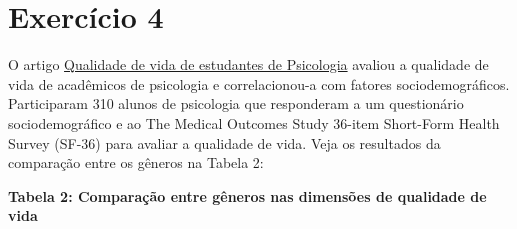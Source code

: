 \documentclass[
]{book}
\begin{document}
\section{Exercício 4}\label{exercuxedcio-4}

O artigo \href{https://pepsic.bvsalud.org/pdf/psicoinfo/v16n16/v16n16a07.pdf}{Qualidade de vida de estudantes de Psicologia} avaliou a qualidade de vida de acadêmicos de psicologia e correlacionou-a com fatores sociodemográficos. Participaram 310 alunos de psicologia que responderam a um questionário sociodemográfico e ao The Medical Outcomes Study 36-item Short-Form Health Survey (SF-36) para avaliar a qualidade de vida. Veja os resultados da comparação entre os gêneros na Tabela 2:

\textbf{Tabela 2: Comparação entre gêneros nas dimensões de qualidade de vida}
\end{document}
